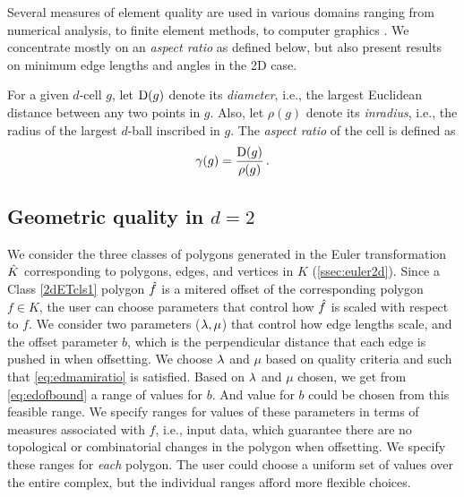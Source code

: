 Several measures of element quality are used in various domains ranging from numerical analysis, to finite element methods, to computer graphics \cite{ChDeSh2012,GiRaBa2012,LiEbZh2009,Si2010}.
We concentrate mostly on an \emph{aspect ratio} as defined below, but also present results on minimum edge lengths and angles in the 2D case.
\begin{defn}
  \label{def:asptrto}
  For a given $d$-cell $g$, let $\operatorname{D}(g)$ denote its \emph{diameter}, i.e., the largest Euclidean distance between any two points in $g$.
  Also, let $\rho(g)$ denote its \emph{inradius}, i.e., the radius of the largest $d$-ball inscribed in $g$.
  The \emph{aspect ratio} of the cell is defined as
  \begin{equation}
    \label{eq:asptrto}
    \gamma(g) = \frac{\operatorname{D}(g)}{\rho(g)} \,.
  \end{equation}
\end{defn}

\subsection{Geometric quality in $d=2$} \label{ssec:qual2d}

We consider the three classes of polygons generated in the Euler transformation $\hat{K}$ corresponding to polygons, edges, and vertices in $K$ (\cref{ssec:euler2d}).
Since a Class \ref{2dETcls1} polygon $\hat{f}$ is a mitered offset of the corresponding polygon $f \in K$, the user can choose parameters that control how $\hat{f}$ is scaled with respect to $f$.
We consider two parameters ($\lambda, \mu$) that control how edge lengths scale, and the offset parameter $b$, which is the perpendicular distance that each edge is pushed in when offsetting.
We choose $\lambda$ and $\mu$ based on quality criteria and such that \cref{eq:edmamiratio} is satisfied.
  Based on $\lambda$ and $\mu$ chosen, we get from \cref{eq:edofbound} a range of values for $b$.
  And value for $b$ could be chosen from this feasible range.   
We specify ranges for values of these parameters in terms of measures associated with $f$, i.e., input data, which guarantee there are no topological or combinatorial changes in the polygon when offsetting.
We specify these ranges for \emph{each} polygon.
The user could choose a uniform set of values over the entire complex, but the individual ranges afford more flexible choices.

